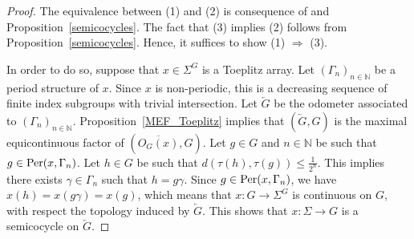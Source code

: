 \documentclass[titlepage,reqno,10pt]{amsart}
\theoremstyle{definition}
\def\N{{\mathbb N}}
\def\Per{{\rm Per}}
\newcommand{\tm}{\subseteq}
\begin{document}
\begin{proof}
The equivalence between (1) and (2) is consequence of \cite[Proposition 5 and Theorem 2]{CoPe08} and Proposition~\ref{semicocycles}. The fact that (3) implies (2) follows from Proposition~\ref{semicocycles}. Hence, it suffices to show (1) $\Rightarrow$ (3).

In order to do so, suppose that $x\in\Sigma^G$ is a Toeplitz array. Let $(\Gamma_n)_{n\in\mathbb{N}}$ be a period structure of $x$. Since $x$ is non-periodic, this is a decreasing sequence of finite index  subgroups with trivial intersection. Let $\overleftarrow{G}$ be the odometer associated to $(\Gamma_n)_{n\in\mathbb{N}}$. Proposition~\ref{MEF_Toeplitz} implies  that $(\overleftarrow{G},G)$  is the maximal equicontinuous factor of $(\overline{O_G(x)},G)$. Let $g\in G$ and $n\in\mathbb{N}$ be such that $g\in\Per(x,\Gamma_n)$. Let $h\in G$ be such that $d(\tau(h),\tau(g))\leq \frac{1}{2^n}$. 
This implies there exists $\gamma\in \Gamma_n$ such that $h= g \gamma$. Since $g\in \Per(x,\Gamma_n)$, we have $x(h)=x(g\gamma)=x(g)$, which means that $x:G\to \Sigma^{G}$ is continuous on $G$, with respect the topology induced by $\overleftarrow{G}$. This shows that $x:\Sigma\to G$ is a semicocycle on $\overleftarrow{G}$.
   \end{proof}
\end{document}
